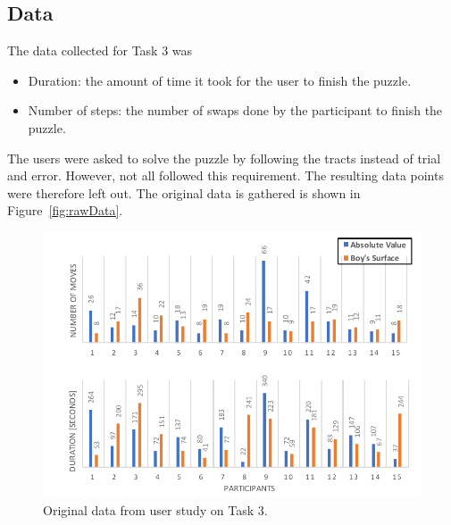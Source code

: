 \documentclass[hyperref, plainreport, noproblem]{cgvpub1}
\begin{document}
\subsection{Data}

The data collected for Task 3 was 
\begin{itemize}
	\item Duration: the amount of time it took for the user to finish the puzzle.
	\item Number of steps: the number of swaps done by the participant to finish the puzzle.
\end{itemize}
The users were asked to solve the puzzle by following the tracts instead of trial and error. However, not all followed this requirement. The resulting data points were therefore left out. The original data is gathered is shown in Figure~\ref{fig:rawData}.

\begin{figure}[ht]
    \centering
    \includegraphics[width = 0.9\columnwidth]{orig_data}
    \caption{Original data from user study on Task 3.}
    \label{fig:orig_data}
\end{figure}
\end{document}
